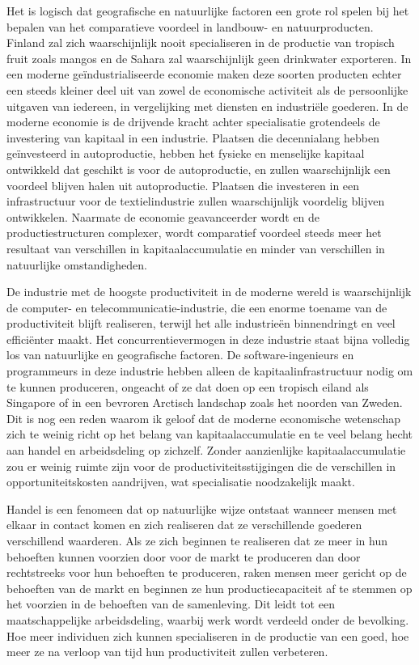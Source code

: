\documentclass[
  a5paper,
  smalldemyvopaper,11pt,twoside,onecolumn,openright,extrafontsizes,
hidelinks]{memoir}
\begin{document}
Het is logisch dat geografische en natuurlijke factoren een grote rol
spelen bij het bepalen van het comparatieve voordeel in landbouw- en
natuurproducten. Finland zal zich waarschijnlijk nooit specialiseren in
de productie van tropisch fruit zoals mangos en de Sahara zal
waarschijnlijk geen drinkwater exporteren. In een moderne
geïndustrialiseerde economie maken deze soorten producten echter een
steeds kleiner deel uit van zowel de economische activiteit als de
persoonlijke uitgaven van iedereen, in vergelijking met diensten en
industriële goederen. In de moderne economie is de drijvende kracht
achter specialisatie grotendeels de investering van kapitaal in een
industrie. Plaatsen die decennialang hebben geïnvesteerd in
autoproductie, hebben het fysieke en menselijke kapitaal ontwikkeld dat
geschikt is voor de autoproductie, en zullen waarschijnlijk een voordeel
blijven halen uit autoproductie. Plaatsen die investeren in een
infrastructuur voor de textielindustrie zullen waarschijnlijk voordelig
blijven ontwikkelen. Naarmate de economie geavanceerder wordt en de
productiestructuren complexer, wordt comparatief voordeel steeds meer
het resultaat van verschillen in kapitaalaccumulatie en minder van
verschillen in natuurlijke omstandigheden.

De industrie met de hoogste productiviteit in de moderne wereld is
waarschijnlijk de computer- en telecommunicatie-industrie, die een
enorme toename van de productiviteit blijft realiseren, terwijl het alle
industrieën binnendringt en veel efficiënter maakt. Het
concurrentievermogen in deze industrie staat bijna volledig los van
natuurlijke en geografische factoren. De software-ingenieurs en
programmeurs in deze industrie hebben alleen de kapitaalinfrastructuur
nodig om te kunnen produceren, ongeacht of ze dat doen op een tropisch
eiland als Singapore of in een bevroren Arctisch landschap zoals het
noorden van Zweden. Dit is nog een reden waarom ik geloof dat de moderne
economische wetenschap zich te weinig richt op het belang van
kapitaalaccumulatie en te veel belang hecht aan handel en arbeidsdeling
op zichzelf. Zonder aanzienlijke kapitaalaccumulatie zou er weinig
ruimte zijn voor de productiviteitsstijgingen die de verschillen in
opportuniteitskosten aandrijven, wat specialisatie noodzakelijk maakt.

Handel is een fenomeen dat op natuurlijke wijze ontstaat wanneer mensen
met elkaar in contact komen en zich realiseren dat ze verschillende
goederen verschillend waarderen. Als ze zich beginnen te realiseren dat
ze meer in hun behoeften kunnen voorzien door voor de markt te
produceren dan door rechtstreeks voor hun behoeften te produceren, raken
mensen meer gericht op de behoeften van de markt en beginnen ze hun
productiecapaciteit af te stemmen op het voorzien in de behoeften van de
samenleving. Dit leidt tot een maatschappelijke arbeidsdeling, waarbij
werk wordt verdeeld onder de bevolking. Hoe meer individuen zich kunnen
specialiseren in de productie van een goed, hoe meer ze na verloop van
tijd hun productiviteit zullen verbeteren.
\end{document}
